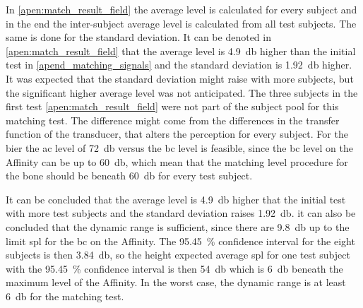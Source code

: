 In \autoref{apen:match_result_field} the average level is calculated for every subject and in the end the inter-subject average level is calculated from all test subjects. The same is done for the standard deviation. It can be denoted in \autoref{apen:match_result_field} that the average level is \SI{4.9}{\decibel} higher than the initial test in \autoref{apend_matching_signals} and the standard deviation is \SI{1.92}{\decibel} higher. It was expected that the standard deviation might raise with more subjects, but the significant higher average level was not anticipated. The three subjects in the first test     \autoref{apen:match_result_field} were not part of the subject pool for this matching test. The difference might come from the differences in the transfer function of the transducer, that alters the perception for every subject. For the \gls{bier} the \gls{ac} level of \SI{72}{\decibel} versus the  \gls{bc} level is feasible, since the \gls{bc} level on the Affinity can be up to \SI{60}{\decibel}, which mean that the matching level procedure for the bone should be beneath \SI{60}{\decibel} for every test subject.

It can be concluded that the average level is  \SI{4.9}{\decibel} higher that the initial test with more test subjects and the standard deviation raises \SI{1.92}{\decibel}. it can also be concluded that the dynamic range is sufficient, since there are \SI{9.8}{\decibel} up to the limit \gls{spl} for the \gls{bc} on the Affinity. The \SI{95.45}{\percent} confidence interval for the eight subjects is then  \SI{3.84}{\decibel}, so the height expected average \gls{spl} for one test subject with the \SI{95.45}{\percent} confidence interval is then \SI{54}{\decibel} which is \SI{6}{\decibel} beneath the maximum level of the Affinity. In the worst case, the dynamic range is at least  \SI{6}{\decibel} for the matching test.
